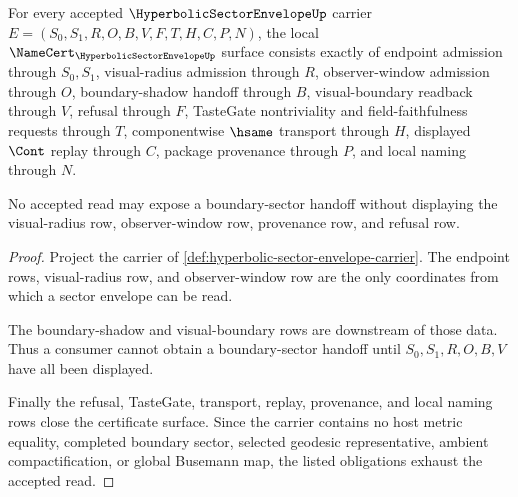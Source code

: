 \begin{theorem}
\label{thm:hyperbolic-sector-envelope-namecert-obligations}
For every accepted $\HyperbolicSectorEnvelopeUp$ carrier $E=(S_0,S_1,R,O,B,V,F,T,H,C,P,N)$, the local $\NameCert_{\HyperbolicSectorEnvelopeUp}$ surface consists exactly of endpoint admission through $S_0,S_1$, visual-radius admission through $R$, observer-window admission through $O$, boundary-shadow handoff through $B$, visual-boundary readback through $V$, refusal through $F$, TasteGate nontriviality and field-faithfulness requests through $T$, componentwise $\hsame$ transport through $H$, displayed $\Cont$ replay through $C$, package provenance through $P$, and local naming through $N$.

No accepted read may expose a boundary-sector handoff without displaying the visual-radius row, observer-window row, provenance row, and refusal row.
\end{theorem}
\begin{proof}
Project the carrier of \autoref{def:hyperbolic-sector-envelope-carrier}. The endpoint rows, visual-radius row, and observer-window row are the only coordinates from which a sector envelope can be read.

The boundary-shadow and visual-boundary rows are downstream of those data. Thus a consumer cannot obtain a boundary-sector handoff until $S_0,S_1,R,O,B,V$ have all been displayed.

Finally the refusal, TasteGate, transport, replay, provenance, and local naming rows close the certificate surface. Since the carrier contains no host metric equality, completed boundary sector, selected geodesic representative, ambient compactification, or global Busemann map, the listed obligations exhaust the accepted read.
\end{proof}

